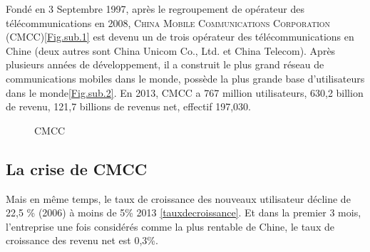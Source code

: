 Fondé en 3 Septembre 1997, après le regroupement de opérateur des télécommunications en 2008, \textsc{China Mobile Communications Corporation} (\textsf{CMCC})\ref{Fig.sub.1} est devenu un de trois opérateur des télécommunications en Chine (deux autres sont \textsf{China Unicom Co., Ltd.} et \textsf{China Telecom}). Après plusieurs années de développement, il a construit le plus grand réseau de communications mobiles dans le monde, possède la plus grande base d'utilisateurs dans le monde\ref{Fig.sub.2}. En 2013, CMCC a 767 million utilisateurs, 630,2 billion \textyen \qquad de revenu, 121,7 billions \textyen de revenus net, effectif 197,030.
\begin{figure}[H]
	\flushleft
	\hfill
	\hspace{1in}
	\caption{CMCC} 
\end{figure}

\subsection{La crise de CMCC}
Mais en même temps, le taux de croissance des nouveaux utilisateur décline de 22,5 \% (2006) à moins de 5\% 2013 \ref{tauxdecroissance}. Et dans la premier 3 mois, l'entreprise une fois considérés comme la plus rentable de Chine, le taux de croissance des revenu net est 0,3\%.

